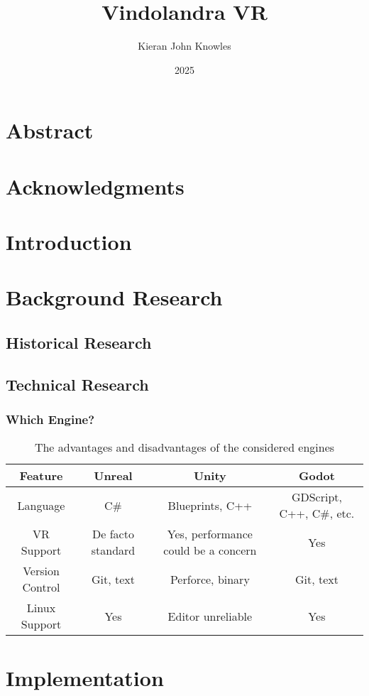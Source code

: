 \documentclass[12pt, a4paper]{report}
\title{Vindolandra VR}
\author{Kieran John Knowles}
\date{2025}
\begin{document}
\maketitle

\chapter*{Abstract}

\chapter*{Acknowledgments}

\tableofcontents
\listoftables
{}


\chapter{Introduction}

\chapter{Background Research}

\section{Historical Research}

\section{Technical Research}

\subsection{Which Engine?}

\begin{table}
\caption{The advantages and disadvantages of the considered engines}
\begin{tabulary}{\textwidth}{cCCC}\toprule
Feature & Unreal & Unity & Godot \\\midrule

Language & C\# & Blueprints, C++ & GDScript, C++, C\#, etc. \\
VR Support & De facto standard & Yes, performance could be a concern & Yes \\
Version Control & Git, text & Perforce, binary & Git, text \\
Linux Support & Yes & Editor unreliable & Yes \\

\bottomrule\end{tabulary}
\end{table}

\chapter{Implementation}


\todos
\end{document}
